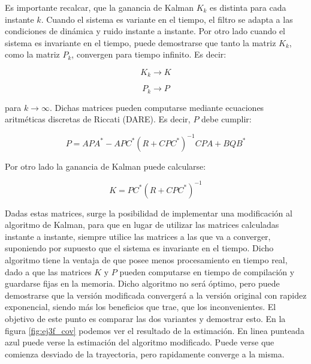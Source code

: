 
	Es importante recalcar, que la ganancia de Kalman $K_k$ es distinta para cada instante $k$. Cuando el sistema es variante en el tiempo, el filtro se adapta a las condiciones de dinámica y ruido instante a instante. Por otro lado cuando el sistema es invariante en el tiempo, puede demostrarse que tanto la matriz $K_k$, como la matriz $P_k$, convergen para tiempo infinito. Es decir:
	
	\begin{equation*}
		K_k \longrightarrow K
	\end{equation*}
	
	\begin{equation*}
		P_k \longrightarrow P
	\end{equation*}
	
	para $k \rightarrow \infty$. Dichas matrices pueden computarse mediante ecuaciones aritméticas discretas de Riccati (DARE). Es decir, $P$ debe cumplir:
	
	\begin{equation*}
		P = A P A^{*} - A P C^{*} (R + C P C^{*})^{-1} C P A + B Q B^{*}
	\end{equation*}
	
	Por otro lado la ganancia de Kalman puede calcularse:
	
	\begin{equation*}
		K = P C^{*} (R + C P C^{*})^{-1}
	\end{equation*}
	
	Dadas estas matrices, surge la posibilidad de implementar una modificación al algoritmo de Kalman, para que en lugar de utilizar las matrices calculadas instante a instante, siempre utilice las matrices a las que va a converger, suponiendo por supuesto que el sistema es invariante en el tiempo. Dicho algoritmo tiene la ventaja de que posee menos procesamiento en tiempo real, dado a que las matrices $K$ y $P$ pueden computarse en tiempo de compilación y guardarse fijas en la memoria. Dicho algoritmo no será óptimo, pero puede demostrarse que la versión modificada convergerá a la versión original con rapidez exponencial, siendo más los beneficios que trae, que los inconvenientes. El objetivo de este punto es comparar las dos variantes y demostrar esto. En la figura \ref{fig:ej3f_cov} podemos ver el resultado de la estimación. En linea punteada azul puede verse la estimación del algoritmo modificado. Puede verse que comienza desviado de la trayectoria, pero rapidamente converge a la misma. 

